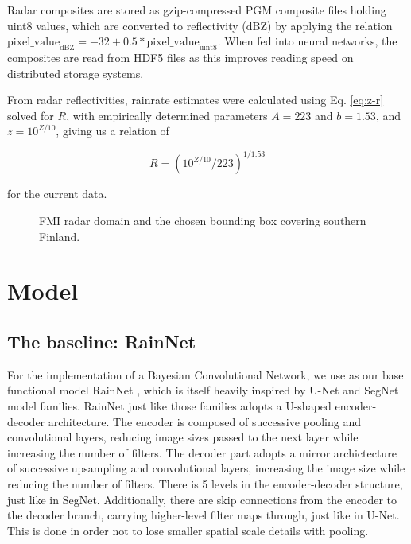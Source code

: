 

Radar composites are stored as gzip-compressed PGM composite files holding uint8 values, which are converted to reflectivity (dBZ) by applying the relation $\text{pixel\_value}_{\text{dBZ}} = -32 + 0.5 * \text{pixel\_value}_{\text{uint8}}$. When fed into neural networks, the composites are read from HDF5 files as this improves reading speed on distributed storage systems. 

From radar reflectivities, rainrate estimates were calculated using Eq. \ref{eq:z-r} solved for $R$, with empirically determined parameters $A=223$ and $b=1.53$, and $z = 10^{Z / 10}$, giving us a relation of

\begin{equation}
R = (10^{Z / 10} / 223)^{1/1.53}
\end{equation}

for the current data. 

\begin{figure}
	\label{fig:domain}
	\caption{FMI radar domain and the chosen bounding box covering southern Finland.}
\end{figure} 


\section{Model}

\subsection{The baseline: RainNet}
\label{section:rainnet}

For the implementation of a Bayesian Convolutional Network, we use as our base functional model RainNet \cite{ayzel_rainnet_nodate}, which is itself heavily inspired by U-Net and SegNet model families. RainNet just like those families adopts a U-shaped encoder-decoder architecture. The encoder is composed of successive pooling and convolutional layers, reducing image sizes passed to the next layer while increasing the number of filters. The decoder part adopts a mirror archictecture of successive upsampling and convolutional layers, increasing the image size while reducing the number of filters. There is 5 levels in the encoder-decoder structure, just like in SegNet. Additionally, there are skip connections from the encoder to the decoder branch, carrying higher-level filter maps through, just like in U-Net. This is done in order not to lose smaller spatial scale details with pooling.  

